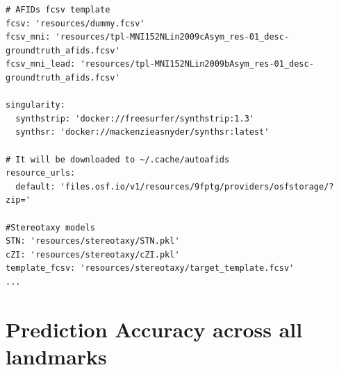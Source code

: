 \begin{verbatim}
# AFIDs fcsv template
fcsv: 'resources/dummy.fcsv'
fcsv_mni: 'resources/tpl-MNI152NLin2009cAsym_res-01_desc-groundtruth_afids.fcsv'
fcsv_mni_lead: 'resources/tpl-MNI152NLin2009bAsym_res-01_desc-groundtruth_afids.fcsv'

singularity:
  synthstrip: 'docker://freesurfer/synthstrip:1.3'
  synthsr: 'docker://mackenzieasnyder/synthsr:latest'

# It will be downloaded to ~/.cache/autoafids
resource_urls:
  default: 'files.osf.io/v1/resources/9fptg/providers/osfstorage/?zip='

#Stereotaxy models 
STN: 'resources/stereotaxy/STN.pkl'
cZI: 'resources/stereotaxy/cZI.pkl'
template_fcsv: 'resources/stereotaxy/target_template.fcsv'
...
\end{verbatim}

\newpage
\section{Prediction Accuracy across all landmarks}

